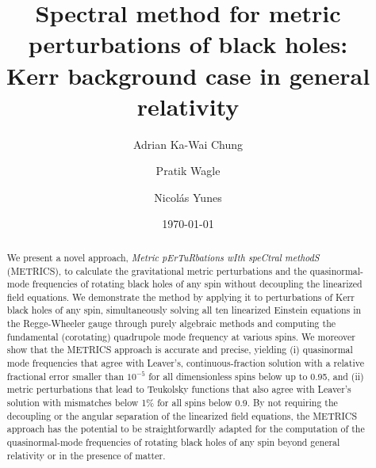 \documentclass[aps,prx,amsmath,floats,floatfix,twocolumn,
  superscriptaddress,nofootinbib,showpacs]{revtex4-1}
\begin{document}

\title{Spectral method for metric perturbations of black holes: \\ Kerr background case in general relativity}%

\author{Adrian Ka-Wai Chung}

\author{Pratik Wagle}

\author{Nicol\'as Yunes}

\date{\today}%

\begin{abstract}
We present a novel approach, \textit{Metric pErTuRbations wIth speCtral methodS} (METRICS), to calculate the gravitational metric perturbations and the quasinormal-mode frequencies of rotating black holes of any spin without decoupling the linearized field equations. 
We demonstrate the method by applying it to perturbations of Kerr black holes of any spin, simultaneously solving all ten linearized Einstein equations in the Regge-Wheeler gauge through purely algebraic methods and computing the fundamental (corotating) quadrupole mode frequency at various spins.  
We moreover show that the METRICS approach is accurate and precise, yielding (i) quasinormal mode frequencies that agree with Leaver's, continuous-fraction solution with a relative fractional error smaller than $10^{-5}$ for all dimensionless spins below up to 0.95, and (ii) metric perturbations that lead to Teukolsky functions that also agree with Leaver's solution with mismatches below 1\% for all spins below 0.9.  
By not requiring the decoupling or the angular separation of the linearized field equations, the METRICS approach has the potential to be straightforwardly adapted for the computation of the quasinormal-mode frequencies of rotating black holes of any spin beyond general relativity or in the presence of matter. 
\end{abstract}
\end{document}
